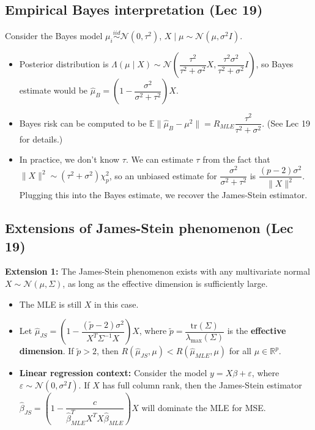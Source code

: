 \documentclass[twoside]{article}
\newcommand\bbE{\mathbb{E}}
\newcommand\bbR{\mathbb{R}}
\newcommand\calN{\mathcal{N}}
\def\eps{\varepsilon}
\newcommand\lmb{\lambda}
\newcommand\Lmb{\Lambda}
\newcommand\sg{\sigma}
\newcommand\Sg{\Sigma}
\begin{document}
\subsection{Empirical Bayes interpretation (Lec 19)}
Consider the Bayes model $\mu_i \stackrel{iid}{\sim} \calN(0, \tau^2)$, $X \mid \mu \sim \calN(\mu, \sg^2 I)$.

\begin{itemize}
\item Posterior distribution is $\Lmb(\mu \mid X) \sim \calN \left( \dfrac{\tau^2}{\tau^2 + \sg^2}X, \dfrac{\tau^2 \sg^2}{\tau^2 + \sg^2} I \right)$, so Bayes estimate would be $\hat{\mu}_B = \left(1 - \dfrac{\sg^2}{\sg^2 + \tau^2} \right) X$.

\item Bayes risk can be computed to be $\bbE \|\hat{\mu}_B - \mu^2 \| = R_{MLE}\dfrac{\tau^2}{\tau^2 + \sg^2}$. (See Lec 19 for details.)

\item In practice, we don't know $\tau$. We can estimate $\tau$ from the fact that $\|X \|^2 \sim (\tau^2 + \sg^2) \chi_p^2$, so an unbiased estimate for $\dfrac{\sg^2}{\sg^2 + \tau^2}$ is $\dfrac{(p-2)\sg^2}{\|X\|^2}$. Plugging this into the Bayes estimate, we recover the James-Stein estimator.
\end{itemize}

\subsection{Extensions of James-Stein phenomenon (Lec 19)}
\textbf{Extension 1:} The James-Stein phenomenon exists with any multivariate normal $X \sim \calN(\mu, \Sg)$, as long as the effective dimension is sufficiently large.
\begin{itemize}
\item The MLE is still $X$ in this case.

\item Let $\hat{\mu}_{JS} = \left(1 - \dfrac{(\tilde{p}-2)\sg^2}{X^T \Sg^{-1} X}\right)X$, where $\tilde{p} = \dfrac{\text{tr}(\Sg)}{\lmb_{\max}(\Sg)}$ is the \textbf{effective dimension}. If $\tilde{p} > 2$, then $R(\hat{\mu}_{JS}, \mu) < R(\hat{\mu}_{MLE}, \mu)$ for all $\mu \in \bbR^p$.

\item \textbf{Linear regression context:} Consider the model $y = X\beta + \eps$, where $\eps \sim \calN(0, \sg^2 I)$. If $X$ has full column rank, then the James-Stein estimator $\hat{\beta}_{JS} = \left(1 - \dfrac{c}{\hat{\beta}_{MLE}^T X^T X \hat{\beta}_{MLE}}\right)X$ will dominate the MLE for MSE.
\end{itemize}
\end{document}

